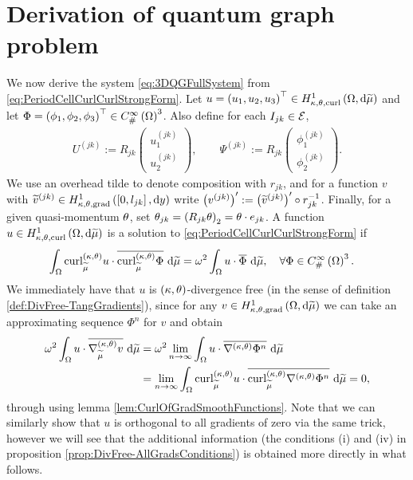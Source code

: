 \section{Derivation of quantum graph problem} \label{sec:3DSystemDerivation}
We now derive the system \eqref{eq:3DQGFullSystem} from \eqref{eq:PeriodCellCurlCurlStrongForm}.
Let $u=\left( u_1,u_2,u_3 \right)^\top\in H^1_{\kappa,\theta,\mathrm{curl}}\left( \Omega, \mathrm{d}\widetilde{\mu} \right)$ and let $\Phi=\left( \phi_1,\phi_2,\phi_3 \right)^\top\in C^{\infty}_{\#}\left( \Omega \right)^3$.
Also define for each $I_{jk}\in\mathcal{E}$,
\begin{align*}
	U^{(jk)} := R_{jk} \begin{pmatrix} u_1^{(jk)} \\ u_2^{(jk)} \end{pmatrix},
	\qquad
	\Psi^{(jk)} := R_{jk} \begin{pmatrix} \phi_1^{(jk)} \\ \phi_2^{(jk)} \end{pmatrix}.
\end{align*}
We use an overhead tilde to denote composition with $r_{jk}$, and for a function $v$ with $\widetilde{v}^{(jk)}\in H^1_{\kappa,\theta,\mathrm{grad}}\left( \left[ 0,l_{jk} \right], \mathrm{d}y \right)$ write $\left( v^{(jk)} \right)' := \left( \widetilde{v}^{(jk)} \right)' \circ r_{jk}^{-1}$.
Finally, for a given quasi-momentum $\theta$, set $\theta_{jk} = \left(  R_{jk}\theta  \right)_2 = \theta\cdot e_{jk}$.
A function $u\in H^1_{\kappa,\theta,\mathrm{curl}}\left( \Omega, \mathrm{d}\widetilde{\mu} \right)$ is a solution to \eqref{eq:PeriodCellCurlCurlStrongForm} if
\begin{align} \label{eq:PeriodCellCurlCurlWeakForm}
	\int_{\Omega} \mathrm{curl}_{\widetilde{\mu}}^{\left( \kappa, \theta \right)}u\cdot\overline{\mathrm{curl}_{\widetilde{\mu}}^{\left( \kappa, \theta \right)}\Phi}  \ \mathrm{d}\widetilde{\mu} 
	&= \omega^2 \int_{\Omega} u\cdot\overline{\Phi}  \ \mathrm{d}\widetilde{\mu},
	\quad\forall \Phi\in C^{\infty}_{\#}\left( \Omega \right)^3.
\end{align}
We immediately have that $u$ is $\left( \kappa, \theta \right)$-divergence free (in the sense of definition \ref{def:DivFree-TangGradients}), since for any $v\in H^1_{\kappa,\theta,\mathrm{grad}}\left( \Omega, \mathrm{d}\widetilde{\mu} \right)$ we can take an approximating sequence $\Phi^n$ for $v$ and obtain
\begin{align*}
	\omega^2\int_{\Omega} u\cdot\overline{\nabla^{\left( \kappa, \theta \right)}_{\widetilde{\mu}}v}  \ \mathrm{d}\widetilde{\mu}
	&= \omega^2 \lim_{n\rightarrow\infty} \int_{\Omega} u\cdot\overline{\nabla^{\left( \kappa, \theta \right)}\Phi^n}  \ \mathrm{d}\widetilde{\mu} \\
	&= \lim_{n\rightarrow\infty} \int_{\Omega} \mathrm{curl}_{\widetilde{\mu}}^{\left( \kappa, \theta \right)}u\cdot\overline{\mathrm{curl}_{\widetilde{\mu}}^{\left( \kappa, \theta \right)}\nabla^{\left( \kappa, \theta \right)}\Phi^n}  \ \mathrm{d}\widetilde{\mu}
	= 0,
\end{align*}
through using lemma \ref{lem:CurlOfGradSmoothFunctions}.
Note that we can similarly show that $u$ is orthogonal to all gradients of zero via the same trick, however we will see that the additional information (the conditions (i) and (iv) in proposition \ref{prop:DivFree-AllGradsConditions}) is obtained more directly in what follows.

